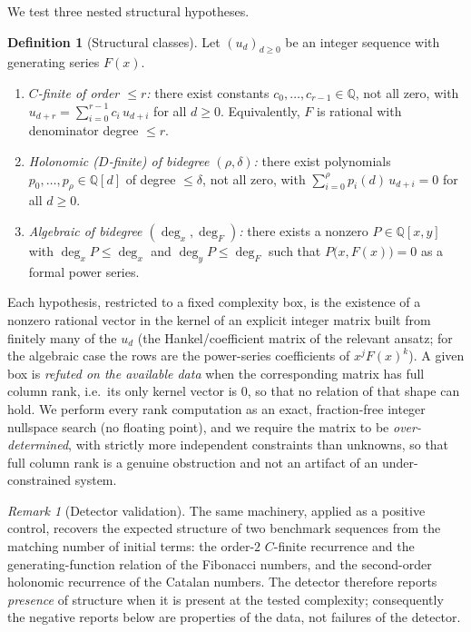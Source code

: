 \documentclass[11pt]{article}
\theoremstyle{plain}
\theoremstyle{definition}
\newtheorem{definition}[theorem]{Definition}
\theoremstyle{remark}
\newtheorem{remark}[theorem]{Remark}
\begin{document}
We test three nested structural hypotheses.

\begin{definition}[Structural classes]
\label{def:struct-classes}
Let $(u_d)_{d\ge 0}$ be an integer sequence with generating series $F(x)$.
\begin{enumerate}[label=(\alph*),itemsep=0.1em]
\item \emph{$C$-finite of order $\le r$:} there exist constants
$c_0,\ldots,c_{r-1}\in\mathbb{Q}$, not all zero, with
$u_{d+r} = \sum_{i=0}^{r-1} c_i\, u_{d+i}$ for all $d\ge 0$. Equivalently,
$F$ is rational with denominator degree $\le r$.
\item \emph{Holonomic ($D$-finite) of bidegree $(\rho,\delta)$:} there
exist polynomials $p_0,\ldots,p_\rho \in \mathbb{Q}[d]$ of degree
$\le \delta$, not all zero, with
$\sum_{i=0}^{\rho} p_i(d)\, u_{d+i} = 0$ for all $d\ge 0$.
\item \emph{Algebraic of bidegree $(\deg_x,\deg_F)$:} there exists a
nonzero $P\in\mathbb{Q}[x,y]$ with $\deg_x P \le \deg_x$ and
$\deg_y P \le \deg_F$ such that $P\bigl(x, F(x)\bigr) = 0$ as a formal
power series.
\end{enumerate}
\end{definition}

Each hypothesis, restricted to a fixed complexity box, is the existence of
a nonzero rational vector in the kernel of an explicit integer matrix built
from finitely many of the $u_d$ (the Hankel/coefficient matrix of the
relevant ansatz; for the algebraic case the rows are the power-series
coefficients of $x^j F(x)^k$). A given box is \emph{refuted on the
available data} when the corresponding matrix has full column rank, i.e.\
its only kernel vector is $0$, so that no relation of that shape can hold.
We perform every rank computation as an exact, fraction-free integer
nullspace search (no floating point), and we require the matrix to be
\emph{over-determined}, with strictly more independent constraints than
unknowns, so that full column rank is a genuine obstruction and not an
artifact of an under-constrained system.

\begin{remark}[Detector validation]
\label{rmk:detector-validation}
The same machinery, applied as a positive control, recovers the expected
structure of two benchmark sequences from the matching number of initial
terms: the order-$2$ $C$-finite recurrence and the generating-function
relation of the Fibonacci numbers, and the second-order holonomic
recurrence of the Catalan numbers. The detector therefore reports
\emph{presence} of structure when it is present at the tested complexity;
consequently the negative reports below are properties of the data, not
failures of the detector.
\end{remark}
\end{document}
